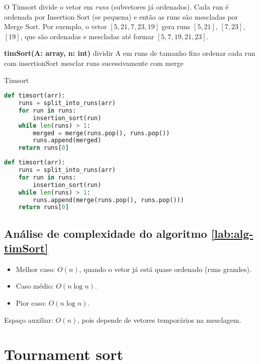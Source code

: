 \begin{exmp}
O Timsort divide o vetor em \textit{runs} (subvetores já ordenados). Cada run é ordenada por Insertion Sort (se pequena) e então as runs são mescladas por Merge Sort.  
Por exemplo, o vetor $[5, 21, 7, 23, 19]$ gera runs $[5, 21]$, $[7, 23]$, $[19]$, que são ordenadas e mescladas até formar $[5, 7, 19, 21, 23]$.
\end{exmp}

\begin{algorithm}[H]
\DontPrintSemicolon
\textbf{timSort(A: array, n: int)}\;
dividir A em runs de tamanho fixo\;
ordenar cada run com insertionSort\;
mesclar runs sucessivamente com merge\;
\caption{Timsort}
\label{lab:alg-timSort}
\end{algorithm}

\begin{lstlisting}[language=Python, caption={Estrutura simplificada do Timsort em Python}, label=code:timSort]
def timsort(arr):
    runs = split_into_runs(arr)
    for run in runs:
        insertion_sort(run)
    while len(runs) > 1:
        merged = merge(runs.pop(), runs.pop())
        runs.append(merged)
    return runs[0]
\end{lstlisting}

\begin{lstlisting}[language=Python, caption={Estrutura simplificada do Timsort em Python}, label=code:timSortPy]
def timsort(arr):
    runs = split_into_runs(arr)
    for run in runs:
        insertion_sort(run)
    while len(runs) > 1:
        runs.append(merge(runs.pop(), runs.pop()))
    return runs[0]
\end{lstlisting}

\subsection{Análise de complexidade do algoritmo \ref{lab:alg-timSort}}
\begin{itemize}
    \item Melhor caso: $O(n)$, quando o vetor já está quase ordenado (runs grandes).
    \item Caso médio: $O(n \log n)$.
    \item Pior caso: $O(n \log n)$.
\end{itemize}
Espaço auxiliar: $O(n)$, pois depende de vetores temporários na mesclagem.

\section{Tournament sort}

